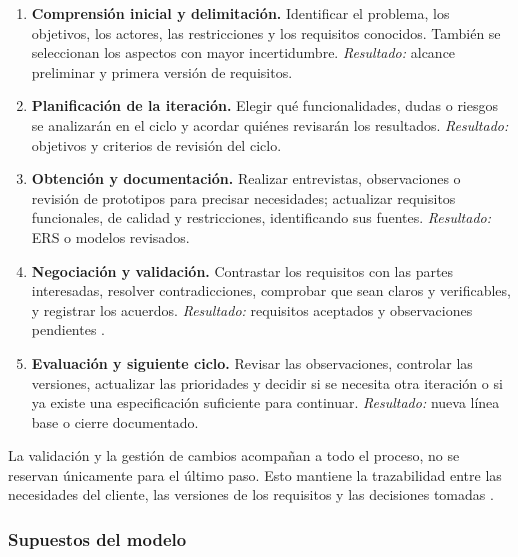 \begin{enumerate}
  \item \textbf{Comprensión inicial y delimitación.} Identificar el problema,
  los objetivos, los actores, las restricciones y los requisitos conocidos.
  También se seleccionan los aspectos con mayor incertidumbre.
  \emph{Resultado:} alcance preliminar y primera versión de requisitos.

  \item \textbf{Planificación de la iteración.} Elegir qué funcionalidades,
  dudas o riesgos se analizarán en el ciclo y acordar quiénes revisarán los
  resultados. \emph{Resultado:} objetivos y criterios de revisión del ciclo.

  \item \textbf{Obtención y documentación.} Realizar entrevistas,
  observaciones o revisión de prototipos para precisar necesidades; actualizar
  requisitos funcionales, de calidad y restricciones, identificando sus
  fuentes. \emph{Resultado:} ERS o modelos revisados.

  \item \textbf{Negociación y validación.} Contrastar los requisitos con
  las partes interesadas, resolver contradicciones, comprobar que sean claros
  y verificables, y registrar los acuerdos. \emph{Resultado:} requisitos
  aceptados y observaciones pendientes \cite{ireb2026,pohl2025}.

  \item \textbf{Evaluación y siguiente ciclo.} Revisar las observaciones,
  controlar las versiones, actualizar las prioridades y decidir si se
  necesita otra iteración o si ya existe una especificación suficiente para
  continuar. \emph{Resultado:} nueva línea base o cierre documentado.
\end{enumerate}

La validación y la gestión de cambios acompañan a todo el proceso, no se
reservan únicamente para el último paso. Esto mantiene la trazabilidad entre
las necesidades del cliente, las versiones de los requisitos y las decisiones
tomadas \cite{pohl2025}.

\subsubsection{Supuestos del modelo}

